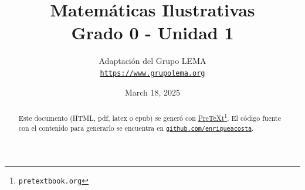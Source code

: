 
\title{Matemáticas Ilustrativas\\
{\large Grado 0 - Unidad 1}}
\author{Adaptación del Grupo LEMA\\
\href{https://www.grupolema.org}{\nolinkurl{https://www.grupolema.org}}
}
\date{March 18, 2025}

\raggedbottom
\label{gra0-uni1}\hypertarget{gra0-uni1}{}
\maketitle
\thispagestyle{empty}
\renewcommand*{\abstractname}{}
\begin{abstract}
Este documento (HTML, pdf, latex o epub) se generó con \href{https://pretextbook.org}{PreTeXt}\footnote{\nolinkurl{pretextbook.org}\label{meta-source-2-2}}. El código fuente con el contenido para generarlo se encuentra en \href{https://github.com/enriqueacosta/IllustrativeMath-GrupoLEMA}{\nolinkurl{github.com/enriqueacosta}}.%
\end{abstract}
\clearpage
\renewcommand*{\abstractname}{Licencia}
